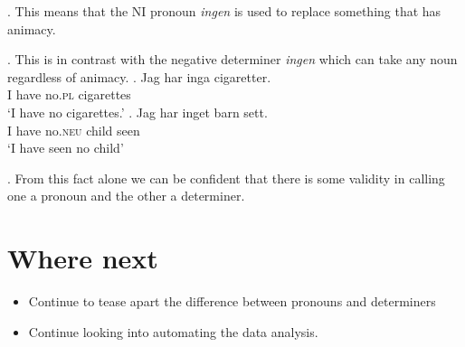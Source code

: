 \documentclass[12pt, letterpaper]{article}
\begin{document}
\ex. This means that the NI pronoun \textit{ingen} is used to replace something that has animacy.

\ex. This is in contrast with the negative determiner \textit{ingen} which can take any noun regardless of animacy.
\ag. Jag har inga cigaretter.\\
I have no.\textsc{pl} cigarettes\\
`I have no cigarettes.'
\bg. Jag har inget barn sett.\\
I have no.\textsc{neu} child seen\\
`I have seen no child'

\ex. From this fact alone we can be confident that there is some validity in calling one a pronoun and the other a determiner.


\section*{Where next}
\begin{itemize}
	\item Continue to tease apart the difference between pronouns and determiners
	\item Continue looking into automating the data analysis.
\end{itemize}



\printbibliography

 
\end{document}
